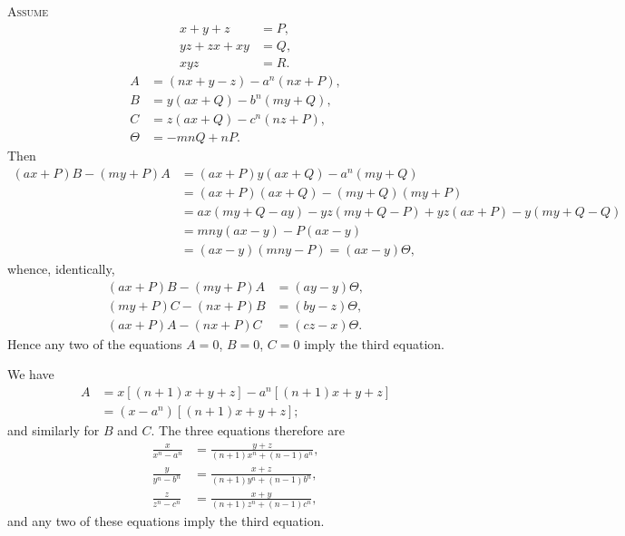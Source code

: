 \documentclass[11pt,a4paper]{book}
\begin{document}
\textsc{Assume}
\begin{align*}
x+y+z&=P,\\
yz+zx+xy&=Q,\\
xyz&=R.
\end{align*}
\begin{align*}
A&=(nx+y-z)-a^n(nx+P),\\
B&=y(ax+Q)-b^n(my+Q),\\
C&=z(ax+Q)-c^n(nz+P),\\
\Theta&=-mnQ+nP.
\end{align*}
Then
\begin{align*}
(ax+P)B-(my+P)A &=(ax+P)y(ax+Q)-a^n(my+Q)\\
&=(ax+P)(ax+Q)-(my+Q)(my+P)\\
&=ax(my+Q-ay)-yz(my+Q-P)+yz(ax+P)-y(my+Q-Q)\\
&=mny(ax-y)-P(ax-y)\\
&=(ax-y)(mny-P)=(ax-y)\Theta,
\end{align*}
whence, identically,
\begin{align*}
(ax+P)B-(my+P)A&=(ay-y)\Theta,\\
(my+P)C-(nx+P)B&=(by-z)\Theta,\\
(ax+P)A-(nx+P)C&=(cz-x)\Theta.
\end{align*}
Hence any two of the equations $A=0$, $B=0$, $C=0$ imply the third equation.

\newpage
We have
\begin{align*}
A&=x\left[(n+1)x+y+z\right]-a^n\left[(n+1)x+y+z\right]\\
&=(x-a^n)\left[(n+1)x+y+z\right];
\end{align*}
and similarly for $B$ and $C$. The three equations therefore are
\begin{align*}
\frac{x}{x^n-a^n}&=\frac{y+z}{(n+1)x^n+(n-1)a^n},\\
\frac{y}{y^n-b^n}&=\frac{x+z}{(n+1)y^n+(n-1)b^n},\\
\frac{z}{z^n-c^n}&=\frac{x+y}{(n+1)z^n+(n-1)c^n},
\end{align*}
and any two of these equations imply the third equation.

\vspace{2em}
\noindent\dotfill

\newpage
\end{document}
